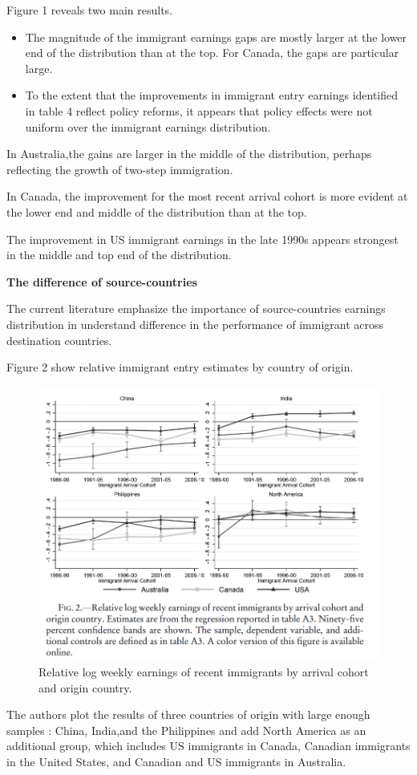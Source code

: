 \documentclass[../root]{subfiles}
\begin{document}
    Figure 1 reveals two main results.
    \begin{itemize}
        \item The magnitude of the immigrant earnings gaps are mostly larger at the lower end of the distribution than at the top. For Canada, the gaps are particular large.
        \item To the extent that the improvements in immigrant entry earnings identified in table 4 reflect policy reforms, it appears that policy effects were not uniform over the immigrant earnings distribution.
    \end{itemize}
    In Australia,the gains are larger in the middle of the distribution, perhaps reflecting the growth of two-step immigration.
    
    In Canada, the improvement for the most recent arrival cohort is more evident at the lower end and middle of the distribution than at the top.
    
    The improvement in US immigrant earnings in the late 1990s appears strongest in the middle and top end of the distribution.
    
    {\bf The difference of source-countries}
    
    The current literature emphasize the importance of source-countries earnings distribution in understand difference in the performance of immigrant across destination countries.
    
    Figure 2 show relative immigrant entry estimates by country of origin.
    
    \begin{figure}
        \centering
        \includegraphics[width = \linewidth]{0828sugiyama/FIgure_2.png}
        \caption{Relative log weekly earnings of recent immigrants by arrival cohort and origin country. }
        \label{fig:my_label}
    \end{figure}
    The authors plot the results of three countries of origin with large enough samples : China, India,and the Philippines and add North America as an additional group, which includes US immigrants in Canada, Canadian immigrants in the United States, and Canadian and US immigrants in Australia. 
    
\end{document}
